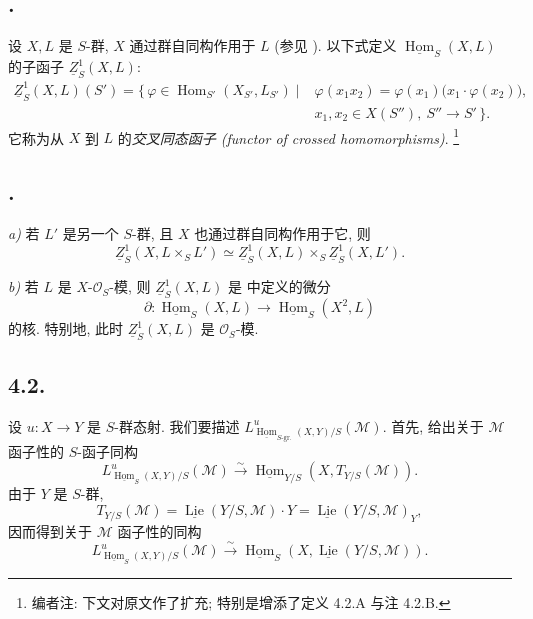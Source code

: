 \subsection*{.}
设 \(X,L\) 是 \(S\)-群, \(X\) 通过群自同构作用于 \(L\)
(参见 ).
以下式定义 \(\underline{\operatorname{Hom}}_S(X,L)\) 的子函子
\(\underline Z^1_S(X,L)\):
\[
\begin{aligned}
 \underline Z^1_S(X,L)(S')
 =\{\,\varphi\in\operatorname{Hom}_{S'}(X_{S'},L_{S'})\mid{}
 &\varphi(x_1x_2)
   =\varphi(x_1)\bigl(x_1\cdot\varphi(x_2)\bigr),\\[-2pt]
 &x_1,x_2\in X(S''),\ S''\to S'\,\}.
\end{aligned}
\]
它称为从 \(X\) 到 \(L\) 的\emph{交叉同态函子 (functor of crossed homomorphisms)}.
\footnote{编者注: 下文对原文作了扩充; 特别是增添了定义 4.2.A 与注 4.2.B.}

\subsection*{.}
\textit{a)} 若 \(L'\) 是另一个 \(S\)-群, 且 \(X\) 也通过群自同构作用于它,
则
\[
 \underline Z^1_S(X,L\times_SL')
 \simeq \underline Z^1_S(X,L)\times_S\underline Z^1_S(X,L').
\]

\textit{b)} 若 \(L\) 是 \(X\)-\(\mathcal O_S\)-模,
则 \(\underline Z^1_S(X,L)\) 是  中定义的微分
\[
 \partial:\underline{\operatorname{Hom}}_S(X,L)
 \longrightarrow\underline{\operatorname{Hom}}_S(X^2,L)
\]
的核. 特别地, 此时 \(\underline Z^1_S(X,L)\) 是 \(\mathcal O_S\)-模.

\subsection*{4.2.}
设 \(u:X\to Y\) 是 \(S\)-群态射. 我们要描述
\(L^u_{\underline{\operatorname{Hom}}_{S\text{-gr.}}(X,Y)/S}
(\mathcal M)\). 首先, 
给出关于 \(\mathcal M\) 函子性的 \(S\)-函子同构
\begin{equation}
 L^u_{\underline{\operatorname{Hom}}_S(X,Y)/S}(\mathcal M)
 \xrightarrow{\sim}
 \underline{\operatorname{Hom}}_{Y/S}(X,T_{Y/S}(\mathcal M)).
 \tag{\(\dagger\)}\label{sga3:ii:subsection:4-2:equation:dagger}
\end{equation}
由于 \(Y\) 是 \(S\)-群,
\[
 T_{Y/S}(\mathcal M)
 =\underline{\operatorname{Lie}}(Y/S,\mathcal M)\cdot Y
 =\underline{\operatorname{Lie}}(Y/S,\mathcal M)_Y,
\]
因而得到关于 \(\mathcal M\) 函子性的同构
\[
 L^u_{\underline{\operatorname{Hom}}_S(X,Y)/S}(\mathcal M)
 \xrightarrow{\sim}
 \underline{\operatorname{Hom}}_S
   (X,\underline{\operatorname{Lie}}(Y/S,\mathcal M)).
\]

